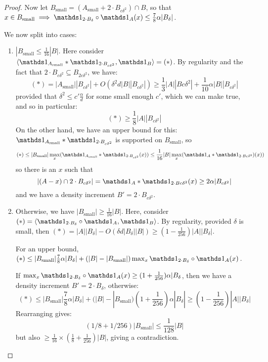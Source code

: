 \documentclass[10pt,a4paper]{article}
\begin{document}
\begin{proof}
  Now let $B_{\text{small}} = (A_{\text{small}} + 2 \cdot B_{c\delta^2})\cap B$, so that $x \in B_{\text{small}} \implies \one_{2\cdot B_\delta}\circ \one_A (x) \leq \frac78 \alpha |B_\delta|$.

  We now split into cases:
  \begin{enumerate}
    \item $|B_{\text{small}}\leq \frac{1}{16}|B|$. Here consider $\angle{\one_{A_\text{small}}\ast \one_{2 \cdot B_{c\delta^2}}, \one_B} = (\ast)$. By regularity and the fact that $2\cdot B_{c\delta^2} \subseteq B_{2c\delta^2}$, we have:
    \[(\ast) = |A_{\text{small}}||B_{c\delta^2}| + O(\delta^2 d|B||B_{c\delta^2}|) \geq \frac13 |A||B{c\delta^2}| + \frac{1}{10}\alpha|B||B_{c\delta^2}|\]
    provided that $\delta^2 \leq c'\frac{\alpha}{d}$ for some small enough $c'$, which we can make true, and so in particular:
    \[(\ast) \geq \frac18|A||B_{c\delta^2}|\]
    On the other hand, we have an upper bound for this: $\one_{A_\text{small}}\ast \one_{2\cdot B_{c\delta^2}}$ is supported on $B_{\text{small}}$, so
    \[(\ast) \leq |B_{\text{small}}| \max_x(\one_{A_\text{small}}\ast \one_{2\cdot B_{c\delta^2}}(x)) \leq \frac{1}{16}|B|\max_x (\one_A \ast \one_{2\cdot Bc\delta^2})(x))\]
    so there is an $x$ such that
    \[|(A-x)\cap 2\cdot B_{c\delta^2}| = \one_A\ast \one_{2 \cdot Bc \delta^2}(x) \geq 2\alpha|B_{c\delta^2}|\]
    and we have a density increment $B' = 2\cdot B_{c\delta^2}$.
    \item Otherwise, we have $|B_{\text{small}}| \geq \frac{1}{16}|B|$. Here, consider $(\ast) = \angle{\one_{2\cdot B_\delta}\circ \one_A, \one_B}$. By regularity, provided $\delta$ is small, then $(\ast) = |A||B_{\delta}|-O(\delta d|B_\delta||B|) \geq (1-\frac{1}{256})|A||B_\delta|$.

    For an upper bound, $(\ast) \leq |B_\text{small}|\frac78 \alpha|B_\delta| + (|B|-|B_{\text{small}}|)\max_x \one_{2\cdot B_\delta}\circ \one_A(x)$.

    If $\max_x \one_{2\cdot B_\delta}\circ \one_A(x) \geq (1+\frac{1}{256})\alpha|B_\delta$, then we have a density increment $B' = 2\cdot B_\delta$, otherwise:
    \[(\ast) \leq |B_\text{small}|\frac{7}{8}\alpha |B_\delta| + (|B|-|B_\text{small})(1+\frac{1}{256})\alpha|B_\delta| \geq (1-\frac{1}{256})|A||B_\delta|\]
    Rearranging gives:
    \[(1/8 + 1/256)|B_\text{small}| \leq \frac{1}{128}|B|\]
    but also $\geq \frac{1}{16}\times(\frac{1}{8} + \frac{1}{256})|B|$, giving a contradiction.
  \end{enumerate}
\end{proof}
\end{document}
